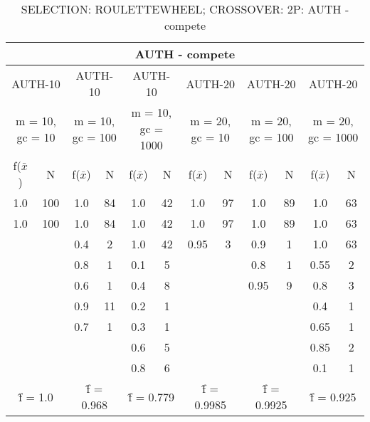 \begin{table}[H]
	\centering
	\caption{SELECTION: ROULETTEWHEEL; CROSSOVER: 2P: AUTH - compete}
	\begin{adjustbox}{width=1\textwidth}
		\begin{tabular}{ |c|c||c|c||c|c||c|c||c|c||c|c| }
			\hline
			\multicolumn{12}{|c|}{AUTH - compete} \\
			\hline
			\multicolumn{2}{|c||}{AUTH-10} & \multicolumn{2}{c||}{AUTH-10} & \multicolumn{2}{c||}{AUTH-10} & \multicolumn{2}{c||}{AUTH-20} & \multicolumn{2}{c||}{AUTH-20} & \multicolumn{2}{c|}{AUTH-20}\\
			\hline
			\multicolumn{2}{|c||}{m = 10, gc = 10} & \multicolumn{2}{c||}{m = 10, gc = 100} & \multicolumn{2}{c||}{m = 10, gc = 1000} & \multicolumn{2}{c||}{m = 20, gc = 10} & \multicolumn{2}{c||}{m = 20, gc = 100} & \multicolumn{2}{c|}{m = 20, gc = 1000}\\
			\hline
			f($\bar{x}$) & N & f($\bar{x}$) & N & f($\bar{x}$) & N & f($\bar{x}$) & N & f($\bar{x}$) & N & f($\bar{x}$) & N\\
			\hline
			\hline
			1.0 & 100 & 1.0 & 84 & 1.0 & 42 & 1.0 & 97 & 1.0 & 89 & 1.0 & 63\\
			\hline
			1.0 & 100 & 1.0 & 84 & 1.0 & 42 & 1.0 & 97 & 1.0 & 89 & 1.0 & 63\\
			&   & 0.4 & 2 & 1.0 & 42 & 0.95 & 3 & 0.9 & 1 & 1.0 & 63\\
			&   & 0.8 & 1 & 0.1 & 5 &   &   & 0.8 & 1 & 0.55 & 2\\
			&   & 0.6 & 1 & 0.4 & 8 &   &   & 0.95 & 9 & 0.8 & 3\\
			&   & 0.9 & 11 & 0.2 & 1 &   &   &   &   & 0.4 & 1\\
			&   & 0.7 & 1 & 0.3 & 1 &   &   &   &   & 0.65 & 1\\
			&   &   &   & 0.6 & 5 &   &   &   &   & 0.85 & 2\\
			&   &   &   & 0.8 & 6 &   &   &   &   & 0.1 & 1\\
			\hline
			\multicolumn{2}{|c||}{\^{f} = 1.0} & \multicolumn{2}{c||}{\^{f} = 0.968} & \multicolumn{2}{c||}{\^{f} = 0.779} & \multicolumn{2}{c||}{\^{f} = 0.9985} & \multicolumn{2}{c||}{\^{f} = 0.9925} & \multicolumn{2}{c|}{\^{f} = 0.925}\\
			\hline
		\end{tabular}
	\end{adjustbox}
\end{table}
